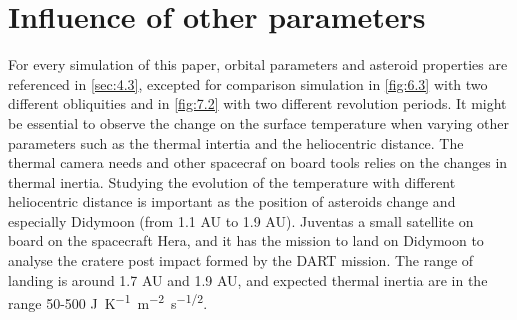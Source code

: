 \section{Influence of other parameters}
\label{sec:8}

For every simulation of this paper, orbital parameters and asteroid properties are referenced in \autoref{sec:4.3}, excepted for comparison simulation in \autoref{fig:6.3} with two different obliquities and in \autoref{fig:7.2} with two different revolution periods. It might be essential to observe the change on the surface temperature when varying other parameters such as the thermal intertia and the heliocentric distance. The thermal camera needs and other spacecraf on board tools relies on the changes in thermal inertia. Studying the evolution of the temperature with different heliocentric distance is important as the position of asteroids change and especially Didymoon (from 1.1 AU to 1.9 AU). Juventas a small satellite on board on the spacecraft Hera, and it has the mission to land on Didymoon to analyse the cratere post impact formed by the DART mission. The range of landing is around 1.7 AU and 1.9 AU, and expected thermal inertia are in the range 50-500 \si{J.K^{-1}.m^{-2}.s^{-1/2}}.

